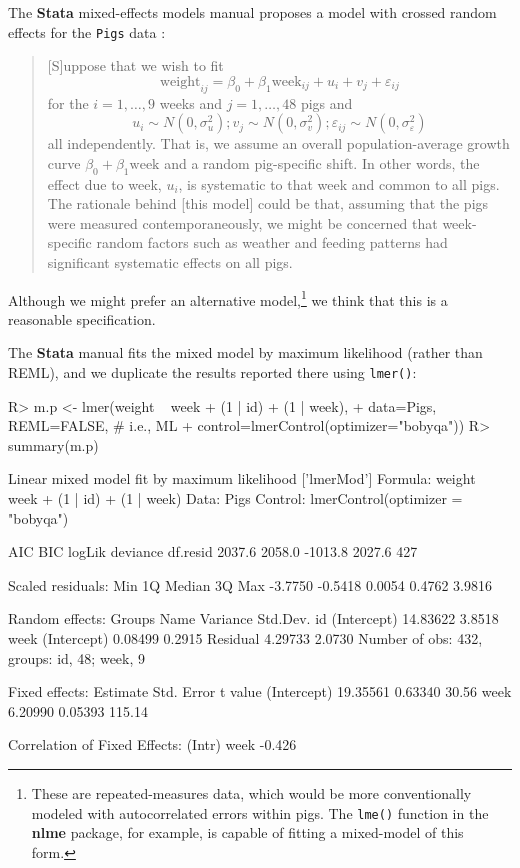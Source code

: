 \documentclass[
]{jss}
\begin{document}
The \textbf{Stata} mixed-effects models manual proposes a model with
crossed random effects for the \texttt{Pigs} data \citep[ page
37]{Stata:2023}:

\begin{quote}
{[}S{]}uppose that we wish to fit \[
\mathrm{weight}_{ij} = \beta_0 + \beta_1 \mathrm{week}_{ij} + u_i + v_j + \varepsilon_{ij} 
\] for the \(i = 1, \ldots, 9\) weeks and \(j = 1, \dots, 48\) pigs and
\[
u_i \sim N(0, \sigma^2_u); v_j \sim N(0, \sigma^2_v ); \varepsilon_{ij} \sim N(0, \sigma^2_\varepsilon)
\] all independently. That is, we assume an overall population-average
growth curve \(\beta_0 + \beta_1 \mathrm{week}\) and a random
pig-specific shift. In other words, the effect due to week, \(u_i\), is
systematic to that week and common to all pigs. The rationale behind
{[}this model{]} could be that, assuming that the pigs were measured
contemporaneously, we might be concerned that week-specific random
factors such as weather and feeding patterns had significant systematic
effects on all pigs.
\end{quote}

Although we might prefer an alternative model,\footnote{These are
  repeated-measures data, which would be more conventionally modeled
  with autocorrelated errors within pigs. The \texttt{lme()} function in
  the \textbf{nlme} package, for example, is capable of fitting a
  mixed-model of this form.} we think that this is a reasonable
specification.

The \textbf{Stata} manual fits the mixed model by maximum likelihood
(rather than REML), and we duplicate the results reported there using
\texttt{lmer()}:

\begin{CodeChunk}
\begin{CodeInput}
R> m.p <- lmer(weight ~ week + (1 | id) + (1 | week),
+             data=Pigs, REML=FALSE, # i.e., ML
+             control=lmerControl(optimizer="bobyqa"))
R> summary(m.p)
\end{CodeInput}
\begin{CodeOutput}
Linear mixed model fit by maximum likelihood  ['lmerMod']
Formula: weight ~ week + (1 | id) + (1 | week)
   Data: Pigs
Control: lmerControl(optimizer = "bobyqa")

     AIC      BIC   logLik deviance df.resid 
  2037.6   2058.0  -1013.8   2027.6      427 

Scaled residuals: 
    Min      1Q  Median      3Q     Max 
-3.7750 -0.5418  0.0054  0.4762  3.9816 

Random effects:
 Groups   Name        Variance Std.Dev.
 id       (Intercept) 14.83622 3.8518  
 week     (Intercept)  0.08499 0.2915  
 Residual              4.29733 2.0730  
Number of obs: 432, groups:  id, 48; week, 9

Fixed effects:
            Estimate Std. Error t value
(Intercept) 19.35561    0.63340   30.56
week         6.20990    0.05393  115.14

Correlation of Fixed Effects:
     (Intr)
week -0.426
\end{CodeOutput}
\end{CodeChunk}
\end{document}
